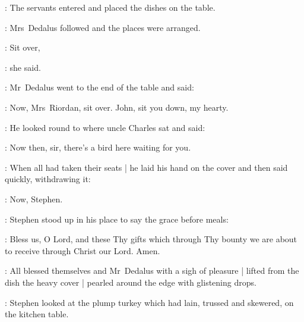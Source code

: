 :
The servants entered
and placed the dishes on the table.

:
Mrs~Dedalus followed
and the places were arranged.

\marydedalus:
Sit over,

:
she said.

:
Mr~Dedalus went to the end of the table
and said:

\simon:
Now, Mrs~Riordan,
sit over.
John,
sit you down,
my hearty.

:
He looked round to where uncle Charles sat and said:

\simon:
Now then, sir,
there’s a bird here waiting for you.

:
When all had taken their seats |
he laid his hand on the cover
and then said quickly,
withdrawing it:

\simon:
Now, Stephen.

:
Stephen stood up in his place
to say the grace before meals:

\Stephen:
Bless us, O Lord,
and these Thy gifts
which through Thy bounty
we are about to receive
through Christ our Lord.
Amen.

:
All blessed themselves
and Mr~Dedalus with a sigh of pleasure |
lifted from the dish
the heavy cover |
pearled around the edge with glistening drops.

:
Stephen looked at the plump turkey
which had lain, trussed and skewered,
on the kitchen table.


\begin{comment}

    \N2:
    He knew that his father had paid a guinea for it
    in Dunn’s of D’Olier Street
    and that the man had prodded it often at the breastbone
    to show how good it was:
    and he remembered the man’s voice when he had said:

    \man:
    Take that one, sir.
    That’s the real Ally Daly.

    \StephenInt:
    Why did Mr~Barrett in Clongowes
    call his pandybat a turkey?
    But Clongowes was far away:
    and the warm heavy smell of turkey and ham and celery
    rose from the plates and dishes
    and the great fire was banked high and red in the grate
    and the green ivy and red holly
    made you feel so happy
    and when dinner was ended
    the big plum pudding would be carried in,
    studded with peeled almonds and sprigs of holly,
    with bluish fire running around it
    and a little green flag flying from the top.

\end{comment}


